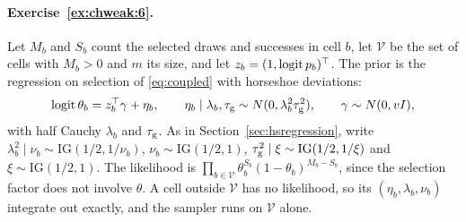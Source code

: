 \paragraph{Exercise~\ref{ex:chweak:6}.} Let $M_b$ and $S_b$ count the selected draws and successes in cell $b$, let $\mathcal V$ be the set of cells with $M_b > 0$ and $m$ its size, and let $z_b = (1, \operatorname{logit} p_b)^\top$. The prior is the regression on selection of \eqref{eq:coupled} with horseshoe deviations:
\[
\operatorname{logit}\theta_b = z_b^\top\gamma + \eta_b, \qquad \eta_b \mid \lambda_b, \tau_{\mathrm{g}} \sim N(0, \lambda_b^2\tau_{\mathrm{g}}^2), \qquad \gamma \sim N(0, vI),
\]
with half Cauchy $\lambda_b$ and $\tau_{\mathrm{g}}$. As in Section~\ref{sec:hsregression}, write $\lambda_b^2 \mid \nu_b \sim \mathrm{IG}(1/2, 1/\nu_b)$, $\nu_b \sim \mathrm{IG}(1/2, 1)$, $\tau_{\mathrm{g}}^2 \mid \xi \sim \mathrm{IG}(1/2, 1/\xi)$ and $\xi \sim \mathrm{IG}(1/2, 1)$. The likelihood is $\prod_{b \in \mathcal V}\theta_b^{S_b}(1 - \theta_b)^{M_b - S_b}$, since the selection factor does not involve $\theta$. A cell outside $\mathcal V$ has no likelihood, so its $(\eta_b, \lambda_b, \nu_b)$ integrate out exactly, and the sampler runs on $\mathcal V$ alone.

